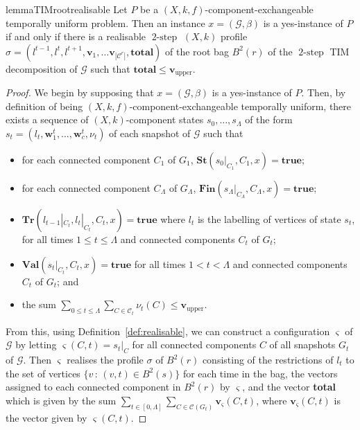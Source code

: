 \documentclass[a4paper,UKenglish,cleveref, autoref, thm-restate]{lipics-v2021} %
\DeclareMathOperator{\twostep}{2-step}
\begin{document}
\begin{toappendix}
\begin{restatable}{lemma}{TIMrootrealisable}\label{lem:TIM-root-realisable}
    Let $P$ be a $(X,k,f)$-component-exchangeable temporally uniform problem. Then an instance $x=(\mathcal{G},\beta)$ is a yes-instance of $P$ if and only if there is a realisable $\twostep$ $(X,k)$ profile $\sigma=(l^{t-1},l^t,l^{t+1},\textbf{v}_1,\ldots\textbf{v}_{|\mathcal{C}^r|}, \textbf{total})$ of the root bag $B^2(r)$ of the $\twostep$ TIM decomposition of $\mathcal{G}$ such that $\textbf{total}\leq \textbf{v}_{\text{upper}}$.
\end{restatable}
\begin{proof}
    We begin by supposing that $x=(\mathcal{G},\beta)$ is a yes-instance of $P$. Then, by definition of being $(X,k,f)$-component-exchangeable temporally uniform, there exists a sequence of $(X,k)$-component states $s_0,\ldots,s_{\Lambda}$ of the form $s_t=(l_t,\textbf{w}^t_1,\ldots,\textbf{w}^t_c, \nu_t)$ of each snapshot of $\mathcal{G}$ such that 
    \begin{itemize}
        \item for each connected component $C_1$ of $G_1$, $\textbf{St}(s_0|_{C_1},C_1,x)=\textbf{true}$;
        \item for each connected component $C_{\Lambda}$ of $G_{\Lambda}$, $\textbf{Fin}(s_{\Lambda}|_{C_{\Lambda}},C_{\Lambda},x)=\textbf{true}$;
        \item $\textbf{Tr}(l_{t-1}|_{C_t}, l_t|_{C_t}, C_t,x)=\textbf{true}$ where $l_t$ is the labelling of vertices of state $s_t$, for all times $1 \leq t \leq \Lambda$ and connected components $C_t$ of $G_t$;
        \item $\textbf{Val}(s_t|_{C_t}, C_t,x)=\textbf{true}$ for all times $1 < t < \Lambda$ and connected components $C_t$ of $G_t$; and
        \item the sum $\sum_{0\leq t\leq \Lambda} \sum_{C \in\mathcal{C}_t}\nu_{t} (C)\leq \textbf{v}_{\text{upper}}$.
    \end{itemize}
    From this, using Definition~\ref{def:realisable}, we can construct a configuration $\varsigma$ of $\mathcal{G}$ by letting $\varsigma(C,t)=s_t|_C$ for all connected components $C$ of all snapshots $G_t$ of $\mathcal{G}$. Then $\varsigma$ realises the profile $\sigma$ of $B^2(r)$ consisting of the restrictions of $l_t$ to the set of vertices $\{v \,:\,(v,t)\in B^2(s)\}$ for each time in the bag, the vectors assigned to each connected component in $B^2(r)$ by $\varsigma$, and the vector \textbf{total} which is given by the sum $\sum_{t\in [0,\Lambda]}\sum_{C\in\mathcal{C}(G_t)}\textbf{v}_{\varsigma}(C,t)$, where $\textbf{v}_{\varsigma}(C,t)$ is the vector given by $\varsigma(C,t)$.


\end{proof}
\end{toappendix}
\end{document}
